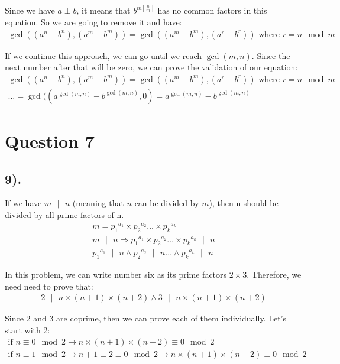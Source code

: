 \documentclass[12pt]{article}
\begin{document}
Since we have $a \perp b$, it means that $b^{m \left\lfloor \frac{n}{m} \right\rfloor}$ has no common factors in this equation.
So we are going to remove it and have:
\begin{gather*}
    \gcd((a^n - b^n), (a^m - b^m)) = \gcd((a^m - b^m), (a^r - b^r)) \text{ where $r = n \mod m$}
\end{gather*}

If we continue this approach, we can go until we reach $\gcd(m,n)$. Since the next number after that will
be zero, we can prove the validation of our equation:
\begin{gather*}
    \gcd((a^n - b^n), (a^m - b^m)) = \gcd((a^m - b^m), (a^r - b^r)) \text{ where $r = n \mod m$} \\
    \ldots
    = \gcd((a^{\gcd(m,n)} - b^{\gcd(m,n)}, 0) = a^{\gcd(m,n)} - b^{\gcd(m,n)}
\end{gather*}

\section*{Question 7}
\subsection*{9).}
If we have $m\text{ $|$ }n$ (meaning that $n$ can be divided by $m$), then n should be divided by all prime factors of n.
\begin{gather*}
    m = {p_{1}}^{a_{1}} \times {p_{2}}^{a_{2}} \ldots \times {p_{k}}^{a_{k}} \\
    m \text{ $|$ } n \Rightarrow {p_{1}}^{a_{1}} \times {p_{2}}^{a_{2}} \ldots \times {p_{k}}^{a_{k}} \text{ $|$ } n \\
    {p_{1}}^{a_{1}} \text{ $|$ } n \wedge {p_{2}}^{a_{2}} \text{ $|$ } n \ldots \wedge {p_{k}}^{a_{k}} \text{ $|$ } n
\end{gather*}

In this problem, we can write number six as its prime factors $2 \times 3$. Therefore, we need need to prove that:
\begin{gather*}
    2 \text{ $|$ } n \times (n+1) \times (n+2) \wedge 3 \text{ $|$ } n \times (n+1) \times (n+2)
\end{gather*}

Since 2 and 3 are coprime, then we can prove each of them individually. Let's start with 2:
\begin{gather*}
    \text{if } n \equiv 0 \mod 2 \to n \times (n+1) \times (n+2) \equiv 0 \mod 2 \\
    \text{if } n \equiv 1 \mod 2 \to n+1 \equiv 2 \equiv 0 \mod 2 \to n \times (n+1) \times (n+2) \equiv 0 \mod 2
\end{gather*}
\end{document}

